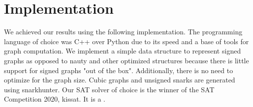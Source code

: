 \section{Implementation}

We achieved our results using the following implementation. The programming language of choice was C++ over Python due to its speed and a base of tools for graph computation. We implement a simple data structure to represent signed graphs as opposed to nauty and other optimized structures because there is little support for signed graphs "out of the box". Additionally, there is no need to optimize for the graph size. Cubic graphs and unsigned snarks are generated using snarkhunter. Our SAT solver of choice is the winner of the SAT Competition 2020\cite{SAT-Competition-2020-solvers}, kissat. It is a .

